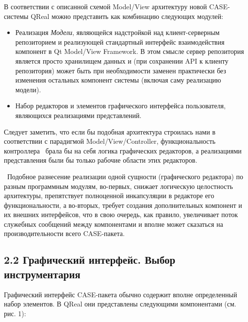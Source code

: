 \documentclass[a4paper]{article}
\newcommand\liststyleWWviiiNumx{%
\renewcommand\labelitemi{[F0B7?]}
\renewcommand\labelitemii{o}
\renewcommand\labelitemiii{[F0B7?]}
\renewcommand\labelitemiv{[F0B7?]}
}
\begin{document}
{
В соответствии с описанной схемой Model/View архитектуру новой
\foreignlanguage{english}{CASE}{}-системы
\foreignlanguage{english}{Q}R\foreignlanguage{english}{eal} можно
представить как комбинацию следующих модулей:}

\liststyleWWviiiNumx
\begin{itemize}
\item {
Реализация \textit{М}\textit{одели}, являющейся надстройкой над
клиент-серверным репозиторием и реализующей стандартный интерфейс
взаимодействия компонент в \foreignlanguage{english}{Qt}
\foreignlanguage{english}{Model}/\foreignlanguage{english}{View}
\foreignlanguage{english}{Framework}. В этом смысле сервер репозитория
является просто хранилищем данных и (при сохранении
\foreignlanguage{english}{API} к клиенту репозитория) может быть при
необходимости заменен практически без изменения остальных компонент
системы (включая саму реализацию модели).}
\item {
Набор редакторов и элементов графического интерфейса пользователя,
являющихся реализациями представлений.}
\end{itemize}
{
Следует заметить, что если бы подобная архитектура строилась нами в
соответствии с парадигмой
\foreignlanguage{english}{Model}/View/\foreignlanguage{english}{Controller},
функциональность контроллера \ брала бы на себя логика графических
редакторов, а реализациями представления были бы только рабочие области
этих редакторов.}

{
\ Подобное разнесение реализации одной сущности (графического редактора)
по разным программным модулям, во-первых, снижает логическую
целостность архитектуры, препятствует полноценной инкапсуляции в
редакторе его функциональности, а во-вторых, требует создания
дополнительных компонент и их внешних интерфейсов, что в свою очередь,
как правило, увеличивает поток служебных сообщений между компонентами и
вполне может сказаться на производительности всего
\foreignlanguage{english}{CASE}{}-пакета.}


\bigskip

\subsection{2.2 Графический интерфейс. Выбор инструментария}
{
Графический интерфейс \foreignlanguage{english}{CASE}{}-пакета обычно
содержит вполне определенный набор элементов. В
\foreignlanguage{english}{QReal} они представлены следующими
компонентами (см. рис. 1):}
\end{document}
